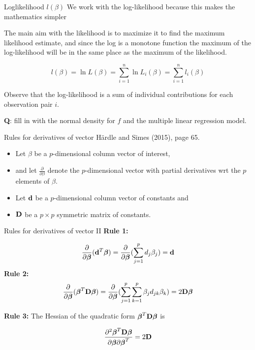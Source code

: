 \documentclass[
  ignorenonframetext,
]{beamer}
\providecommand{\tightlist}{%
  \setlength{\itemsep}{0pt}\setlength{\parskip}{0pt}}
\begin{document}
\begin{frame}
\begin{block}{Loglikelihood \(l(\beta)\)}
\label{loglikelihood-lbeta}
We work with the log-likelihood because this makes the mathematics
simpler

The main aim with the likelihood is to maximize it to find the maximum
likelihood estimate, and since the log is a monotone function the
maximum of the log-likelihood will be in the same place as the maximum
of the likelihood.

\[
l(\beta)=\ln L(\beta)=\sum_{i=1}^n \ln L_i(\beta)=\sum_{i=1}^n l_i(\beta)
\]

Observe that the log-likelihood is a sum of individual contributions for
each observation pair \(i\).

\textbf{Q}: fill in with the normal density for \(f\) and the multiple
linear regression model.
\end{block}
\end{frame}

\begin{frame}
\begin{block}{Rules for derivatives of vector}
\label{rules-for-derivatives-of-vector}
Härdle and Simes (2015), page 65.

\begin{itemize}
\tightlist
\item
  Let \({\beta}\) be a \(p\)-dimensional column vector of interest,
\item
  and let \(\frac{\partial}{\partial {\beta}}\) denote the
  \(p\)-dimensional vector with partial derivatives wrt the \(p\)
  elements of \({\beta}\).
\item
  Let \({\bf d}\) be a \(p\)-dimensional column vector of constants and
\item
  \({\bf D}\) be a \(p\times p\) symmetric matrix of constants.
\end{itemize}
\end{block}
\end{frame}

\begin{frame}
\begin{block}{Rules for derivatives of vector II}
\label{rules-for-derivatives-of-vector-ii}
\textbf{Rule 1:}

\[\frac{\partial}{\partial \boldsymbol{\beta}}({\bf d}^T\boldsymbol{\beta})=\frac{\partial}{\partial \boldsymbol{\beta}}(\sum_{j=1}^p d_j \beta_j)={\bf d}\]
\textbf{Rule 2:}
\[\frac{\partial}{\partial \boldsymbol{\beta}}(\boldsymbol{\beta}^T{\bf D}\boldsymbol{\beta})=\frac{\partial}{\partial \boldsymbol{\beta}}(\sum_{j=1}^p \sum_{k=1}^p \beta_j d_{jk} \beta_k)=2{\bf D}\boldsymbol{\beta}\]

\textbf{Rule 3:} The Hessian of the quadratic form
\(\boldsymbol{\beta}^T{\bf D}\boldsymbol{\beta}\) is

\[\frac{\partial^2 \boldsymbol{\beta}^T{\bf D}\boldsymbol{\beta}}{\partial \boldsymbol{\beta}\partial \boldsymbol{\beta}^T}= 2{\bf D}\]
\end{block}
\end{frame}
\end{document}
